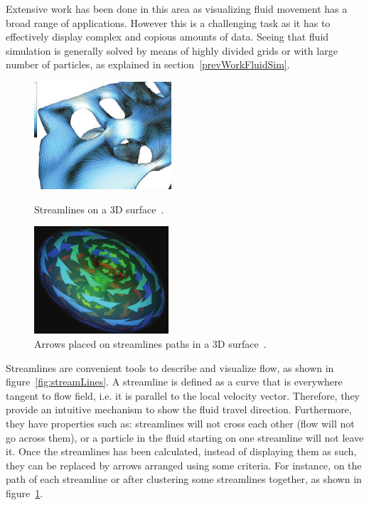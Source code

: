 Extensive work has been done in this area as visualizing fluid movement has a broad range of applications.
However this is a challenging task as it has to effectively display complex and copious amounts of data.
Seeing that fluid simulation is generally solved by means of highly divided grids or with large number of particles, as explained in section~\ref{prevWorkFluidSim}.\\

\begin{figure}[h]
	\centering
	\begin{minipage}[t]{.45\textwidth}
		\centering
		\includegraphics[width=.8\textwidth,height=4cm]{images/streamLinesSpencer}
		\caption{Streamlines on a 3D surface~\cite{Spencer2009}.}
		\label{fig:streamLines}
	\end{minipage}\hfill
	\begin{minipage}[t]{.45\textwidth}
		\centering
		\includegraphics[width=.8\textwidth,height=4cm]{images/streamArrows}
		\caption{Arrows placed on streamlines paths in a 3D surface~\cite{loffelmann1998}.}
		\label{fig:streamArrows}
	\end{minipage}
\end{figure}

Streamlines are convenient tools to describe and visualize flow, as shown in figure~\ref{fig:streamLines}.
A streamline is defined as a curve that is everywhere tangent to flow field, i.e. it is parallel to the local velocity vector.
Therefore, they provide an intuitive mechanism to show the fluid travel direction.
Furthermore, they have properties such as: streamlines will not cross each other (flow will not go across them), or a particle in the fluid starting on one streamline will not leave it.
Once the streamlines has been calculated, instead of displaying them as such, they can be replaced by arrows arranged using some criteria.
For instance, on the path of each streamline or after clustering some streamlines together, as shown in figure~\ref{fig:streamArrows}.\\

